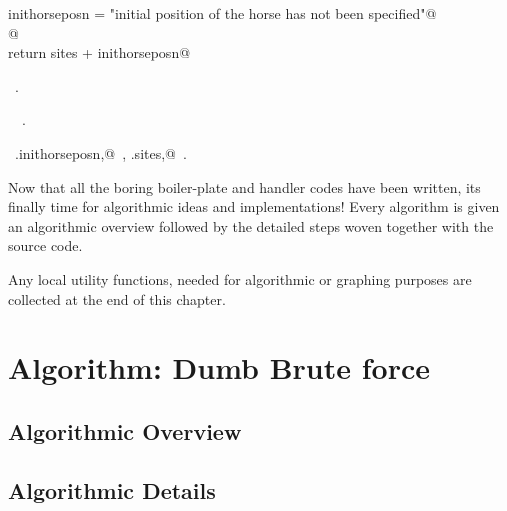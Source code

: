 \documentclass[11.5pt]{report}
\begin{document}
\begin{flushleft}
\begin{list}{}{}
\mbox{}\verb@              inithorseposn = "\nThe initial position of the horse has not been specified"@\\
\mbox{}\verb@              @\\
\mbox{}\verb@          return sites + inithorseposn@\\
\mbox{}\verb@@{\NWsep}
\end{list}
\vspace{-1.5ex}
\footnotesize
\begin{list}{}{\setlength{\itemsep}{-\parsep}\setlength{\itemindent}{-\leftmargin}}
\item \NWtxtMacroRefIn\ .
\item \NWtxtIdentsDefed\nobreak\  \verb@HorseFlyInput@\nobreak\ .\item \NWtxtIdentsUsed\nobreak\  \verb@self.inithorseposn,@\nobreak\ , \verb@self.sites,@\nobreak\ .
\item{}
\end{list}
\vspace{4ex}
\end{flushleft}
Now that all the boring boiler-plate and handler codes have been 
written, its finally time for algorithmic ideas and implementations! 
Every algorithm is given an algorithmic overview followed by the 
detailed steps woven together with the source code. 

Any local utility functions, needed for algorithmic or graphing purposes 
are collected at the end of this chapter. 

\newpage

\section{Algorithm: Dumb Brute force}

\subsection{Algorithmic Overview}

\subsection{Algorithmic Details}
\end{document}
